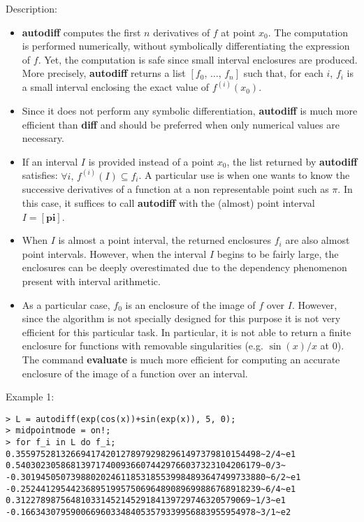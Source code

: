 \noindent Description: \begin{itemize}

\item \textbf{autodiff} computes the first $n$ derivatives of $f$ at point $x_0$. The computation
   is performed numerically, without symbolically differentiating the expression
   of $f$. Yet, the computation is safe since small interval enclosures are
   produced. More precisely, \textbf{autodiff} returns a list $[f_0,\,\dots,\,f_n]$ such that,
   for each $i$, $f_i$ is a small interval enclosing the exact value of $f^{(i)}(x_0)$.

\item Since it does not perform any symbolic differentiation, \textbf{autodiff} is much 
   more efficient than \textbf{diff} and should be preferred when only numerical values
   are necessary.

\item If an interval $I$ is provided instead of a point $x_0$, the list returned by
   \textbf{autodiff} satisfies: $\forall i,\, f^{(i)}(I) \subseteq f_i$. A particular use
   is when one wants to know the successive derivatives of a function at a non
   representable point such as $\pi$. In this case, it suffices to call \textbf{autodiff}
   with the (almost) point interval $I = [\textbf{pi}]$.

\item When $I$ is almost a point interval, the returned enclosures $f_i$ are also
   almost point intervals. However, when the interval $I$ begins to be fairly
   large, the enclosures can be deeply overestimated due to the dependency
   phenomenon present with interval arithmetic.

\item As a particular case, $f_0$ is an enclosure of the image of $f$ over $I$.
   However, since the algorithm is not specially designed for this purpose it is
   not very efficient for this particular task. In particular, it is not able to
   return a finite enclosure for functions with removable singularities
   (e.g. $\sin(x)/x$ at $0$). The command \textbf{evaluate} is much more efficient for
   computing an accurate enclosure of the image of a function over an interval.
\end{itemize}
\noindent Example 1: 
\begin{center}\begin{minipage}{15cm}\begin{Verbatim}[frame=single]
> L = autodiff(exp(cos(x))+sin(exp(x)), 5, 0);
> midpointmode = on!;
> for f_i in L do f_i;
0.3559752813266941742012789792982961497379810154498~2/4~e1
0.5403023058681397174009366074429766037323104206179~0/3~
-0.3019450507398802024611853185539984893647499733880~6/2~e1
-0.252441295442368951995750696489089699886768918239~6/4~e1
0.31227898756481033145214529184139729746320579069~1/3~e1
-0.16634307959006696033484053579339956883955954978~3/1~e2
\end{Verbatim}
\end{minipage}\end{center}
